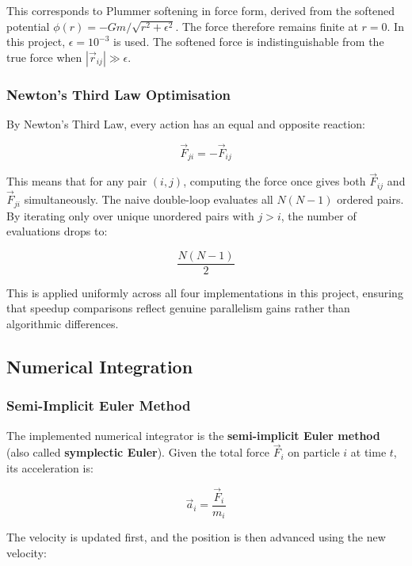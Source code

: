 ﻿\documentclass[12pt,a4paper]{article}
\begin{document}
This corresponds to Plummer softening in force form, derived from the
softened potential $\phi(r) = -Gm / \sqrt{r^2 + \epsilon^2}$. The force
therefore remains finite at $r=0$. In this project, $\epsilon = 10^{-3}$ is
used. The softened force is indistinguishable from the true force when
$|\vec{r}_{ij}| \gg \epsilon$.

\subsubsection*{Newton's Third Law Optimisation}

By Newton's Third Law, every action has an equal and opposite reaction:

\begin{equation}
    \vec{F}_{ji} = -\vec{F}_{ij}
\end{equation}

This means that for any pair $(i, j)$, computing the force once gives both
$\vec{F}_{ij}$ and $\vec{F}_{ji}$ simultaneously. The naive double-loop
evaluates all $N(N-1)$ ordered pairs. By iterating only over unique
unordered pairs with $j > i$, the number of evaluations drops to:

\begin{equation}
    \frac{N(N-1)}{2}
\end{equation}

This is applied uniformly across all four implementations in this project,
ensuring that speedup comparisons reflect genuine parallelism gains rather
than algorithmic differences.

\subsection{Numerical Integration}

\subsubsection*{Semi-Implicit Euler Method}

The implemented numerical integrator is the \textbf{semi-implicit Euler
method} (also called \textbf{symplectic Euler}). Given the total force
$\vec{F}_i$ on particle $i$ at time $t$, its acceleration is:

\begin{equation}
    \vec{a}_i = \frac{\vec{F}_i}{m_i}
\end{equation}

The velocity is updated first, and the position is then advanced using the
new velocity:
\end{document}
